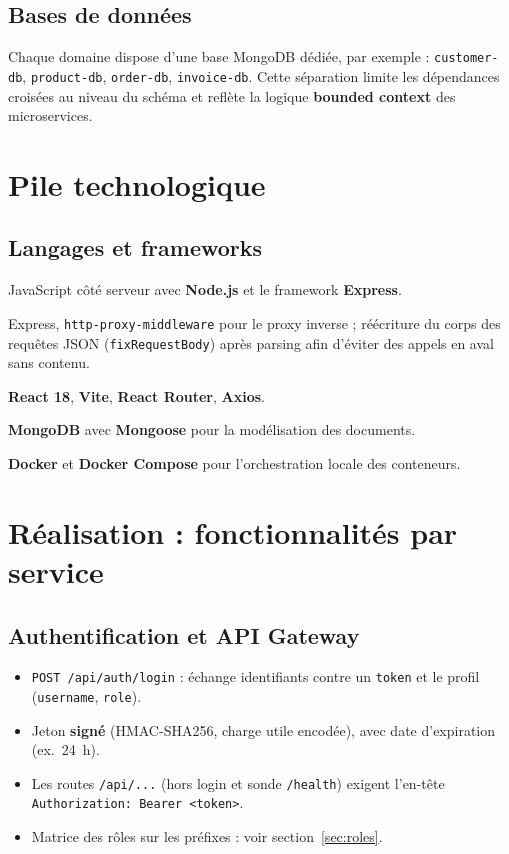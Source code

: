 \documentclass[11pt,a4paper]{article}
\begin{document}
\subsection{Bases de données}
Chaque domaine dispose d'une base MongoDB dédiée, par exemple : \texttt{customer-db}, \texttt{product-db}, \texttt{order-db}, \texttt{invoice-db}. Cette séparation limite les dépendances croisées au niveau du schéma et reflète la logique \textbf{bounded context} des microservices.

\section{Pile technologique}

\subsection{Langages et frameworks}
\begin{description}[style=nextline]
  \item[Backend] JavaScript côté serveur avec \textbf{Node.js} et le framework \textbf{Express}.
  \item[Passerelle] Express, \texttt{http-proxy-middleware} pour le proxy inverse ; réécriture du corps des requêtes JSON (\texttt{fixRequestBody}) après parsing afin d'éviter des appels en aval sans contenu.
  \item[Frontend] \textbf{React 18}, \textbf{Vite}, \textbf{React Router}, \textbf{Axios}.
  \item[Persistance] \textbf{MongoDB} avec \textbf{Mongoose} pour la modélisation des documents.
  \item[Déploiement] \textbf{Docker} et \textbf{Docker Compose} pour l'orchestration locale des conteneurs.
\end{description}

\section{Réalisation : fonctionnalités par service}

\subsection{Authentification et API Gateway}
\begin{itemize}[noitemsep]
  \item \texttt{POST /api/auth/login} : échange identifiants contre un \texttt{token} et le profil (\texttt{username}, \texttt{role}).
  \item Jeton \textbf{signé} (HMAC-SHA256, charge utile encodée), avec date d'expiration (ex.\ 24~h).
  \item Les routes \texttt{/api/...} (hors login et sonde \texttt{/health}) exigent l'en-tête \texttt{Authorization: Bearer <token>}.
  \item Matrice des rôles sur les préfixes : voir section~\ref{sec:roles}.
\end{itemize}
\end{document}
